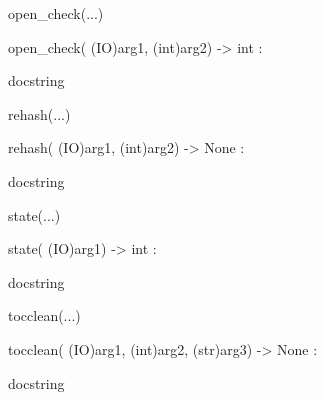 \documentclass[letterpaper,10pt,english]{sphinxmanual}
\begin{document}
\begin{description}
\begin{description}
\begin{DUlineblock}{0em}
\begin{DUlineblock}{\DUlineblockindent}
\begin{DUlineblock}{\DUlineblockindent}
\end{DUlineblock}
\end{DUlineblock}
\item[] open\_check(...)
\item[]
\begin{DUlineblock}{\DUlineblockindent}
\item[] open\_check( (IO)arg1, (int)arg2) -\textgreater{} int :
\item[]
\begin{DUlineblock}{\DUlineblockindent}
\item[] docstring
\item[] 
\end{DUlineblock}
\end{DUlineblock}
\item[] rehash(...)
\item[]
\begin{DUlineblock}{\DUlineblockindent}
\item[] rehash( (IO)arg1, (int)arg2) -\textgreater{} None :
\item[]
\begin{DUlineblock}{\DUlineblockindent}
\item[] docstring
\item[] 
\end{DUlineblock}
\end{DUlineblock}
\item[] state(...)
\item[]
\begin{DUlineblock}{\DUlineblockindent}
\item[] state( (IO)arg1) -\textgreater{} int :
\item[]
\begin{DUlineblock}{\DUlineblockindent}
\item[] docstring
\item[] 
\end{DUlineblock}
\end{DUlineblock}
\item[] tocclean(...)
\item[]
\begin{DUlineblock}{\DUlineblockindent}
\item[] tocclean( (IO)arg1, (int)arg2, (str)arg3) -\textgreater{} None :
\item[]
\begin{DUlineblock}{\DUlineblockindent}
\item[] docstring
\item[] 
\end{DUlineblock}

\end{DUlineblock}
\end{DUlineblock}
\end{description}
\end{description}
\end{document}
